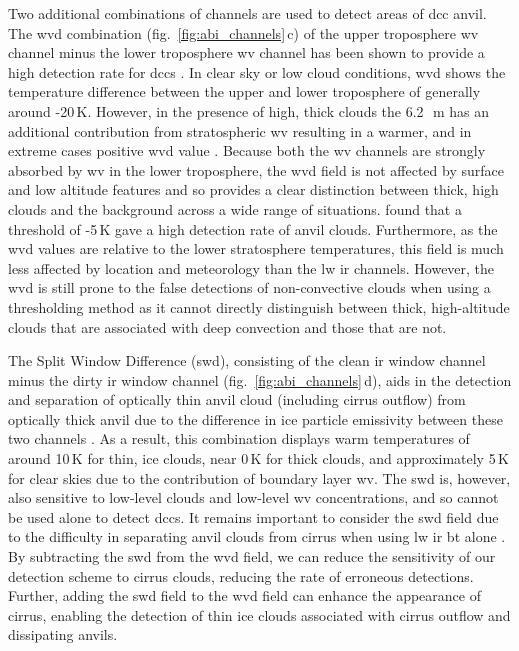 Two additional combinations of channels are used to detect areas of \acrshort{dcc} anvil. 
The \acrshort{wvd} combination (fig.~\ref{fig:abi_channels}\,c) of the upper troposphere \acrshort{wv} channel minus the lower troposphere \acrshort{wv} channel has been shown to provide a high detection rate for \acrshort{dcc}s \citep{muller_role_2018, muller_novel_2019}.
In clear sky or low cloud conditions, \acrshort{wvd} shows the temperature difference between the upper and lower troposphere of generally around -20\,\unit{K}. 
However, in the presence of high, thick clouds the 6.2\,\unit{\mu m} has an additional contribution from stratospheric \acrshort{wv} resulting in a warmer, and in extreme cases positive \acrshort{wvd} value \citep{schmetz_monitoring_1997}.
Because both the \acrshort{wv} channels are strongly absorbed by \acrshort{wv} in the lower troposphere, the \acrshort{wvd} field is not affected by surface and low altitude features and so provides a clear distinction between thick, high clouds and the background across a wide range of situations.
\citet{muller_novel_2019} found that a threshold of -5\,\unit{K} gave a high detection rate of anvil clouds.
Furthermore, as the \acrshort{wvd} values are relative to the lower stratosphere temperatures, this field is much less affected by location and meteorology than the \acrshort{lw} \acrshort{ir} channels.
However, the \acrshort{wvd} is still prone to the false detections of non-convective clouds when using a thresholding method as it cannot directly distinguish between thick, high-altitude clouds that are associated with deep convection and those that are not.

The Split Window Difference (\acrshort{swd}), consisting of the clean \acrshort{ir} window channel minus the dirty \acrshort{ir} window channel (fig.~\ref{fig:abi_channels}\,d), aids in the detection and separation of optically thin anvil cloud (including cirrus outflow) from optically thick anvil due to the difference in ice particle emissivity between these two channels \citep{heidinger_gazing_2009}.
As a result, this combination displays warm temperatures of around 10\,\unit{K} for thin, ice clouds, near 0\,\unit{K} for thick clouds, and approximately 5\,\unit{K} for clear skies due to the contribution of boundary layer \acrshort{wv}.
The \acrshort{swd} is, however, also sensitive to low-level clouds and low-level \acrshort{wv} concentrations, and so cannot be used alone to detect \acrshort{dcc}s.
It remains important to consider the \acrshort{swd} field due to the difficulty in separating anvil clouds from cirrus when using \acrshort{lw} \acrshort{ir} \acrshort{bt} alone \citep{hong_detection_2005}. 
By subtracting the \acrshort{swd} from the \acrshort{wvd} field, we can reduce the sensitivity of our detection scheme to cirrus clouds, reducing the rate of erroneous detections.
Further, adding the \acrshort{swd} field to the \acrshort{wvd} field can enhance the appearance of cirrus, enabling the detection of thin ice clouds associated with cirrus outflow and dissipating anvils.

